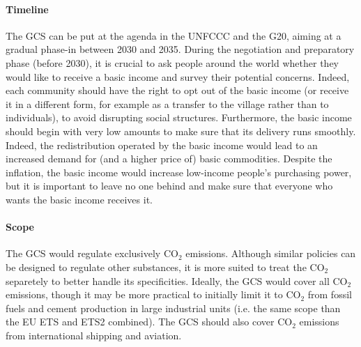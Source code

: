 \documentclass[12pt,english]{article}
\begin{document}
\paragraph{Timeline} 
The GCS can be put at the agenda in the UNFCCC and the G20, aiming at a gradual phase-in between 2030 and 2035. During the negotiation and preparatory phase (before 2030), it is crucial to ask people around the world whether they would like to receive a basic income and survey their potential concerns. Indeed, each community should have the right to opt out of the basic income (or receive it in a different form, for example as a transfer to the village rather than to individuals), to avoid disrupting social structures. Furthermore, the basic income should begin with very low amounts to make sure that its delivery runs smoothly. Indeed, the redistribution operated by the basic income would lead to an increased demand for (and a higher price of) basic commodities. Despite the inflation, the basic income would increase low-income people's purchasing power, but it is important to leave no one behind and make sure that everyone who wants the basic income receives it. %

\paragraph{Scope} 
The GCS would regulate exclusively CO$_\text{2}$ emissions. Although similar policies can be designed to regulate other substances, it is more suited to treat the CO$_\text{2}$ separetely to better handle its specificities. Ideally, the GCS would cover all CO$_\text{2}$ emissions, though it may be more practical to initially limit it to CO$_\text{2}$ from fossil fuels and cement production in large industrial units (i.e. the same scope than the EU ETS and ETS2 combined). The GCS should also cover CO$_\text{2}$ emissions from international shipping and aviation. 
\end{document}
